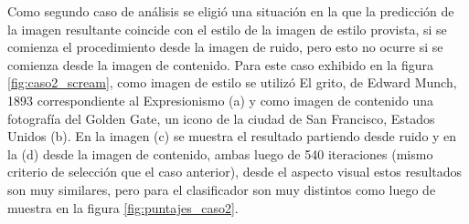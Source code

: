 \documentclass[a4paper,11pt,spanish]{book}
\begin{document}
	
	Como segundo caso de análisis se eligió una situación en la que la predicción de la imagen resultante coincide con el estilo de la imagen de estilo provista, si se comienza
	el procedimiento desde la imagen de ruido, pero esto no ocurre si se comienza desde la imagen de contenido.
	Para este caso exhibido en la figura \ref{fig:caso2_scream}, como imagen de estilo se utilizó El grito, de Edward Munch, 1893 correspondiente al Expresionismo (a) 
	y como imagen de contenido una fotografía del Golden Gate, un
	icono de la ciudad de San Francisco, Estados Unidos (b). En la imagen (c) se muestra el resultado partiendo desde ruido y en la (d) desde la imagen de contenido, ambas luego de
	540 iteraciones (mismo criterio de selección que el caso anterior), desde el aspecto visual estos resultados son muy similares, pero para el clasificador son muy distintos como luego de muestra en la figura \ref{fig:puntajes_caso2}.
\end{document}

